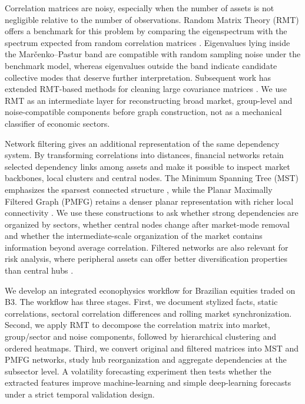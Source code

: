 Correlation matrices are noisy, especially when the number of assets is not negligible relative to the number of observations. Random Matrix Theory (RMT) offers a benchmark for this problem by comparing the eigenspectrum with the spectrum expected from random correlation matrices \cite{marcenko_1967_distribution,laloux_1999_noise,plerou_2002_random}. Eigenvalues lying inside the Mar\v{c}enko--Pastur band are compatible with random sampling noise under the benchmark model, whereas eigenvalues outside the band indicate candidate collective modes that deserve further interpretation. Subsequent work has extended RMT-based methods for cleaning large covariance matrices \cite{bun_2017_cleaning}. We use RMT as an intermediate layer for reconstructing broad market, group-level and noise-compatible components before graph construction, not as a mechanical classifier of economic sectors.

Network filtering gives an additional representation of the same dependency system. By transforming correlations into distances, financial networks retain selected dependency links among assets and make it possible to inspect market backbones, local clusters and central nodes. The Minimum Spanning Tree (MST) emphasizes the sparsest connected structure \cite{mantegna_1999_hierarchical}, while the Planar Maximally Filtered Graph (PMFG) retains a denser planar representation with richer local connectivity \cite{tumminello_2005_tool,tumminello_2010_correlation}. We use these constructions to ask whether strong dependencies are organized by sectors, whether central nodes change after market-mode removal and whether the intermediate-scale organization of the market contains information beyond average correlation. Filtered networks are also relevant for risk analysis, where peripheral assets can offer better diversification properties than central hubs \cite{pozzi_2013_spread,aste_2010_correlation}.

We develop an integrated econophysics workflow for Brazilian equities traded on B3. The workflow has three stages. First, we document stylized facts, static correlations, sectoral correlation differences and rolling market synchronization. Second, we apply RMT to decompose the correlation matrix into market, group/sector and noise components, followed by hierarchical clustering and ordered heatmaps. Third, we convert original and filtered matrices into MST and PMFG networks, study hub reorganization and aggregate dependencies at the subsector level. A volatility forecasting experiment then tests whether the extracted features improve machine-learning and simple deep-learning forecasts under a strict temporal validation design.


